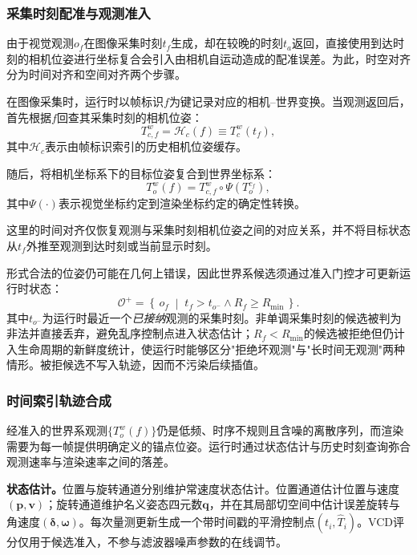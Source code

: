 \documentclass[review]{vgtc}
\begin{document}
\subsubsection{采集时刻配准与观测准入}\label{sec:alignment}

由于视觉观测$o_f$在图像采集时刻$t_f$生成，却在较晚的时刻$t_a$返回，直接使用到达时刻的相机位姿进行坐标复合会引入由相机自运动造成的配准误差。为此，时空对齐分为时间对齐和空间对齐两个步骤。

在图像采集时，运行时以帧标识$f$为键记录对应的相机--世界变换。当观测返回后，首先根据$f$回查其采集时刻的相机位姿：
\begin{equation}
T_{c,f}^{w}
=
\mathcal{H}_c(f)
\equiv
T_c^w(t_f),
\label{eq:temporal-alignment}
\end{equation}
其中$\mathcal{H}_c$表示由帧标识索引的历史相机位姿缓存。

随后，将相机坐标系下的目标位姿复合到世界坐标系：
\begin{equation}
T_o^w(f)
=
T_{c,f}^{w}
\circ
\Psi\!\left(T_o^{c_f}\right),
\label{eq:spatial-alignment}
\end{equation}
其中$\Psi(\cdot)$表示视觉坐标约定到渲染坐标约定的确定性转换。

这里的时间对齐仅恢复观测与采集时刻相机位姿之间的对应关系，并不将目标状态从$t_f$外推至观测到达时刻或当前显示时刻。

形式合法的位姿仍可能在几何上错误，因此世界系候选须通过准入门控才可更新运行时状态：
\begin{equation}
\mathcal{O}^{+} = \left\{\, o_f \;\middle|\; t_f > t_{o^-} \wedge R_f \geq R_{\min} \,\right\}.
\label{eq:admission}
\end{equation}
其中$t_{o^-}$为运行时最近一个\emph{已接纳}观测的采集时刻。非单调采集时刻的候选被判为非法并直接丢弃，避免乱序控制点进入状态估计；$R_f < R_{\min}$的候选被拒绝但仍计入生命周期的新鲜度统计，使运行时能够区分"拒绝坏观测"与"长时间无观测"两种情形。被拒候选不写入轨迹，因而不污染后续插值。

\subsubsection{时间索引轨迹合成}\label{sec:smoothing}

经准入的世界系观测$\{T_o^w(f)\}$仍是低频、时序不规则且含噪的离散序列，而渲染需要为每一帧提供明确定义的锚点位姿。运行时通过状态估计与历史时刻查询弥合观测速率与渲染速率之间的落差。

\textbf{状态估计。}位置与旋转通道分别维护常速度状态估计。位置通道估计位置与速度$(\mathbf{p}, \mathbf{v})$；旋转通道维护名义姿态四元数$\mathbf{q}$，并在其局部切空间中估计误差旋转与角速度$(\boldsymbol{\delta}, \boldsymbol{\omega})$。每次量测更新生成一个带时间戳的平滑控制点$(t_i, \widehat{T}_i)$。VCD评分仅用于候选准入，不参与滤波器噪声参数的在线调节。
\end{document}
